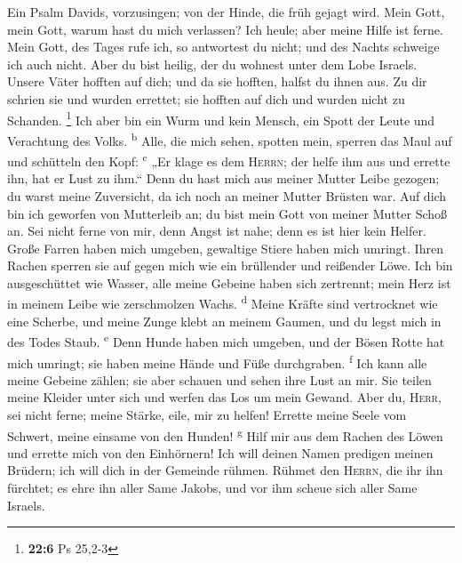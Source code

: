  Ein Psalm Davids, vorzusingen; von der Hinde, die früh
gejagt wird.  Mein Gott, mein Gott, warum hast du mich
verlassen? Ich heule; aber meine Hilfe ist ferne.  Mein
Gott, des Tages rufe ich, so antwortest du nicht; und des Nachts
schweige ich auch nicht.  Aber du bist heilig, der du
wohnest unter dem Lobe Israels.  Unsere Väter hofften auf
dich; und da sie hofften, halfst du ihnen aus.  Zu dir
schrien sie und wurden errettet; sie hofften auf dich und wurden nicht
zu Schanden. \footnote{\textbf{22:6} Ps 25,2-3}  Ich aber
bin ein Wurm und kein Mensch, ein Spott der Leute und Verachtung des
Volks. \textsuperscript{b}  Alle, die mich sehen, spotten
mein, sperren das Maul auf und schütteln den Kopf: \textsuperscript{c}
 „Er klage es dem \textsc{Herrn}; der helfe ihm aus und
errette ihn, hat er Lust zu ihm.``  Denn du hast mich aus
meiner Mutter Leibe gezogen; du warst meine Zuversicht, da ich noch an
meiner Mutter Brüsten war.  Auf dich bin ich geworfen von
Mutterleib an; du bist mein Gott von meiner Mutter Schoß an.
 Sei nicht ferne von mir, denn Angst ist nahe; denn es
ist hier kein Helfer.  Große Farren haben mich umgeben,
gewaltige Stiere haben mich umringt.  Ihren Rachen
sperren sie auf gegen mich wie ein brüllender und reißender Löwe.
 Ich bin ausgeschüttet wie Wasser, alle meine Gebeine
haben sich zertrennt; mein Herz ist in meinem Leibe wie zerschmolzen
Wachs. \textsuperscript{d}  Meine Kräfte sind vertrocknet
wie eine Scherbe, und meine Zunge klebt an meinem Gaumen, und du legst
mich in des Todes Staub. \textsuperscript{e}  Denn Hunde
haben mich umgeben, und der Bösen Rotte hat mich umringt; sie haben
meine Hände und Füße durchgraben. \textsuperscript{f} 
Ich kann alle meine Gebeine zählen; sie aber schauen und sehen ihre Lust
an mir.  Sie teilen meine Kleider unter sich und werfen
das Los um mein Gewand.  Aber du, \textsc{Herr}, sei
nicht ferne; meine Stärke, eile, mir zu helfen!  Errette
meine Seele vom Schwert, meine einsame von den Hunden!
\textsuperscript{g}  Hilf mir aus dem Rachen des Löwen
und errette mich von den Einhörnern!  Ich will deinen
Namen predigen meinen Brüdern; ich will dich in der Gemeinde rühmen.
 Rühmet den \textsc{Herrn}, die ihr ihn fürchtet; es ehre
ihn aller Same Jakobs, und vor ihm scheue sich aller Same Israels.
